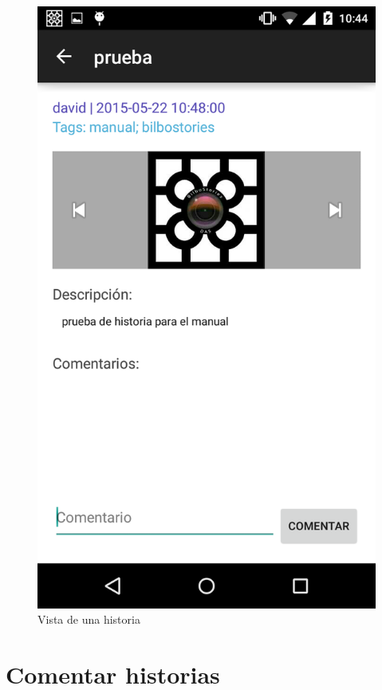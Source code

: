 \documentclass[11pt,a4paper, titlepage]{article}
\begin{document}
	\begin{figure}[hbtp]
		\centering
		\includegraphics[scale = 0.25 ]{img/15}
		\caption{Vista de una historia}
		\label{p22}
	\end{figure}
	
	\FloatBarrier
	\section{Comentar historias}
	
\end{document}
